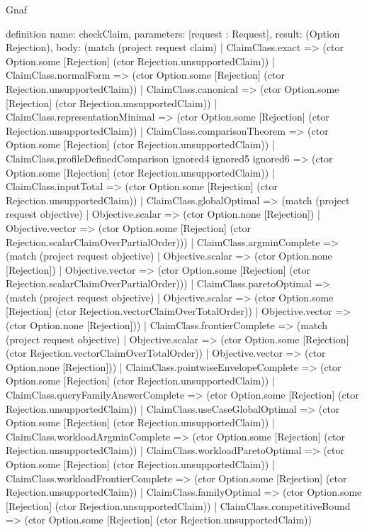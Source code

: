 \begin{lexlean}{Gnaf}
\begin{semanticmodule}
definition{
  name: checkClaim,
  parameters: [request : Request],
  result: (Option Rejection),
  body: (match (project request claim)
    | ClaimClass.exact => (ctor Option.some [Rejection] (ctor Rejection.unsupportedClaim))
    | ClaimClass.normalForm => (ctor Option.some [Rejection] (ctor Rejection.unsupportedClaim))
    | ClaimClass.canonical => (ctor Option.some [Rejection] (ctor Rejection.unsupportedClaim))
    | ClaimClass.representationMinimal => (ctor Option.some [Rejection] (ctor Rejection.unsupportedClaim))
    | ClaimClass.comparisonTheorem => (ctor Option.some [Rejection] (ctor Rejection.unsupportedClaim))
    | ClaimClass.profileDefinedComparison ignored4 ignored5 ignored6 => (ctor Option.some [Rejection] (ctor Rejection.unsupportedClaim))
    | ClaimClass.inputTotal => (ctor Option.some [Rejection] (ctor Rejection.unsupportedClaim))
    | ClaimClass.globalOptimal => (match (project request objective)
      | Objective.scalar => (ctor Option.none [Rejection])
      | Objective.vector => (ctor Option.some [Rejection] (ctor Rejection.scalarClaimOverPartialOrder)))
    | ClaimClass.argminComplete => (match (project request objective)
      | Objective.scalar => (ctor Option.none [Rejection])
      | Objective.vector => (ctor Option.some [Rejection] (ctor Rejection.scalarClaimOverPartialOrder)))
    | ClaimClass.paretoOptimal => (match (project request objective)
      | Objective.scalar => (ctor Option.some [Rejection] (ctor Rejection.vectorClaimOverTotalOrder))
      | Objective.vector => (ctor Option.none [Rejection]))
    | ClaimClass.frontierComplete => (match (project request objective)
      | Objective.scalar => (ctor Option.some [Rejection] (ctor Rejection.vectorClaimOverTotalOrder))
      | Objective.vector => (ctor Option.none [Rejection]))
    | ClaimClass.pointwiseEnvelopeComplete => (ctor Option.some [Rejection] (ctor Rejection.unsupportedClaim))
    | ClaimClass.queryFamilyAnswerComplete => (ctor Option.some [Rejection] (ctor Rejection.unsupportedClaim))
    | ClaimClass.useCaseGlobalOptimal => (ctor Option.some [Rejection] (ctor Rejection.unsupportedClaim))
    | ClaimClass.workloadArgminComplete => (ctor Option.some [Rejection] (ctor Rejection.unsupportedClaim))
    | ClaimClass.workloadParetoOptimal => (ctor Option.some [Rejection] (ctor Rejection.unsupportedClaim))
    | ClaimClass.workloadFrontierComplete => (ctor Option.some [Rejection] (ctor Rejection.unsupportedClaim))
    | ClaimClass.familyOptimal => (ctor Option.some [Rejection] (ctor Rejection.unsupportedClaim))
    | ClaimClass.competitiveBound => (ctor Option.some [Rejection] (ctor Rejection.unsupportedClaim))
}
\end{semanticmodule}
\end{lexlean}
